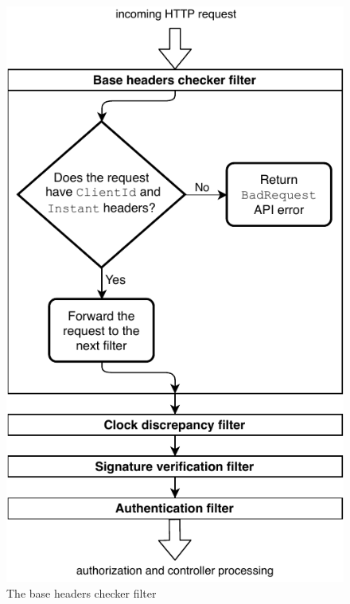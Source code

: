 \begin{figure}[!htb]
    \includegraphics[width=\textwidth]{figures/base-headers-checker-filter.pdf}
    \caption{The base headers checker filter}
    \label{fig:base-headers-checker-filter}
\end{figure}

